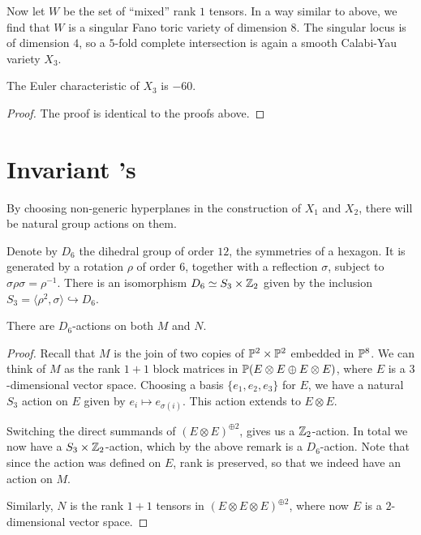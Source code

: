 Now let $W$ be the set of ``mixed'' rank $1$ tensors. In a way similar to above, we find that $W$ is a singular Fano toric variety of dimension $8$. The singular locus is of dimension $4$, so a $5$-fold complete intersection is again a smooth Calabi-Yau variety $X_3$.

\begin{proposition}
The Euler characteristic of $X_3$ is $-60$.
\end{proposition}
\begin{proof}
The proof is identical to the proofs above.
\end{proof}


\section{Invariant \CY's}

By choosing non-generic hyperplanes in the construction of $X_1$ and $X_2$, there will be natural group actions on them.

Denote by $D_6$ the dihedral group of order $12$, the symmetries of a hexagon. It is generated by a rotation $\rho$ of order $6$, together with a reflection $\sigma$, subject to $\sigma \rho \sigma = \rho^{-1}$. There is an isomorphism $D_6 \simeq S_3 \times \Z_2$ given by the inclusion $S_3 = \langle \rho^2, \sigma \rangle \hookrightarrow D_6$. 


\begin{lemma}
There are $D_6$-actions on both $M$ and $N$.
\end{lemma}
\begin{proof}
Recall that $M$ is the join of two copies of $\P^2 \times \P^2$ embedded in $\P^8$. We can think of $M$ as the rank $1+1$ block matrices in $\P(E \otimes E \oplus E \otimes E)$, where $E$ is a $3$-dimensional vector space. Choosing a basis $\{e_1,e_2,e_3\}$ for $E$, we have a natural $S_3$ action on $E$ given by $e_i \mapsto e_{\sigma(i)}$. This action extends to $E \otimes E$. 

Switching the direct summands of ${\left(E \otimes E\right)}^{\oplus 2}$, gives us a $\Z_2$-action. In total we now have a $S_3 \times \Z_2$-action, which by the above remark is a $D_6$-action. Note that since the action was defined on $E$, rank is preserved, so that we indeed have an action on $M$.

Similarly, $N$ is the rank $1+1$ tensors in ${\left(E \otimes E \otimes E \right)}^{\oplus 2}$, where now $E$ is a $2$-dimensional vector space. 
\end{proof}


